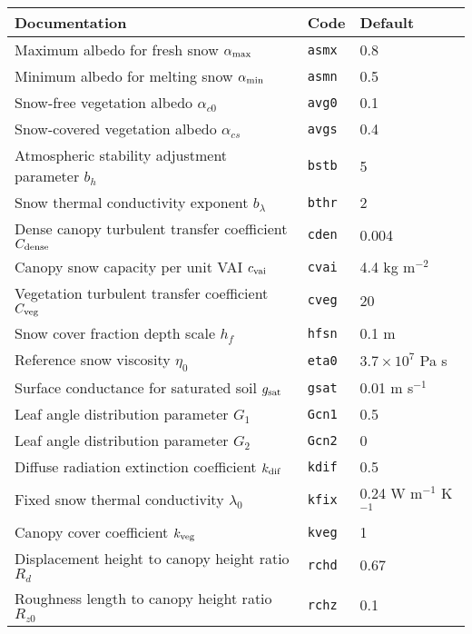 \documentclass{article}
\begin{document}
\vskip20pt
\begin{tabular}{|l|l|l|}
\hline
Documentation                                      & Code       & Default                \\
\hline
Maximum albedo for fresh snow $\alpha_{\rm max}$   & {\tt asmx} & 0.8                    \\
Minimum albedo for melting snow $\alpha_{\rm min}$ & {\tt asmn} & 0.5                    \\
Snow-free vegetation albedo $\alpha_{c0}$          & {\tt avg0} & 0.1                    \\
Snow-covered vegetation albedo $\alpha_{cs}$       & {\tt avgs} & 0.4                    \\ 
Atmospheric stability adjustment parameter $b_h$   & {\tt bstb} & 5                      \\
Snow thermal conductivity exponent $b_\lambda$     & {\tt bthr} & 2                      \\
Dense canopy turbulent transfer coefficient $C_{\rm dense}$ & {\tt cden} & 0.004         \\
Canopy snow capacity per unit VAI $c_{\rm vai}$    & {\tt cvai} & 4.4 kg m$^{-2}$        \\
Vegetation turbulent transfer coefficient $C_{\rm veg}$ & {\tt cveg} & 20                \\
Snow cover fraction depth scale $h_f$ & {\tt hfsn} & 0.1 m                               \\
Reference snow viscosity $\eta_0$                  & {\tt eta0} & $3.7 \times 10^7$ Pa s \\
Surface conductance for saturated soil $g_{\rm sat}$ & {\tt gsat} & 0.01 m s$^{-1}$      \\
Leaf angle distribution parameter $G_1$            & {\tt Gcn1}   & 0.5                  \\
Leaf angle distribution parameter $G_2$            & {\tt Gcn2}   & 0                    \\
Diffuse radiation extinction coefficient $k_{\rm dif}$ & {\tt kdif} &  0.5               \\
Fixed snow thermal conductivity $\lambda_0$        & {\tt kfix} & 0.24 W m$^{-1}$ K$^{-1}$ \\
Canopy cover coefficient $k_{\rm veg}$             & {\tt kveg} &  1 \\
Displacement height to canopy height ratio $R_d$   & {\tt rchd} & 0.67 \\
Roughness length to canopy height ratio $R_{z0}$   & {\tt rchz} & 0.1 \\

\end{tabular}
\end{document}
